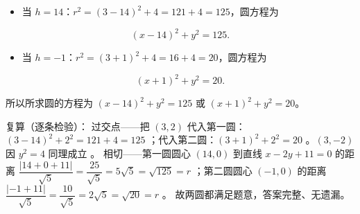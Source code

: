 \begin{answer}
\begin{itemize}
\item 当 $h=14$：$r^2=(3-14)^2+4=121+4=125$，圆方程为
\end{itemize}
\nopagebreak[4]
\[
(x-14)^2+y^2=125.
\]
\begin{itemize}
\item 当 $h=-1$：$r^2=(3+1)^2+4=16+4=20$，圆方程为
\end{itemize}
\nopagebreak[4]
\[
(x+1)^2+y^2=20.
\]

所以所求圆的方程为 $(x-14)^2+y^2=125$ 或 $(x+1)^2+y^2=20$。

复算（逐条检验）：
过交点——把 $(3,2)$ 代入第一圆：$(3-14)^2+2^2=121+4=125$ ；代入第二圆：$(3+1)^2+2^2=20$ 。$(3,-2)$ 因 $y^2=4$ 同理成立 。
相切——第一圆圆心 $(14,0)$ 到直线 $x-2y+11=0$ 的距离 $\dfrac{|14+0+11|}{\sqrt5}=\dfrac{25}{\sqrt5}=5\sqrt5=\sqrt{125}=r$ ；第二圆圆心 $(-1,0)$ 的距离 $\dfrac{|-1+11|}{\sqrt5}=\dfrac{10}{\sqrt5}=2\sqrt5=\sqrt{20}=r$ 。
故两圆都满足题意，答案完整、无遗漏。



\end{answer}